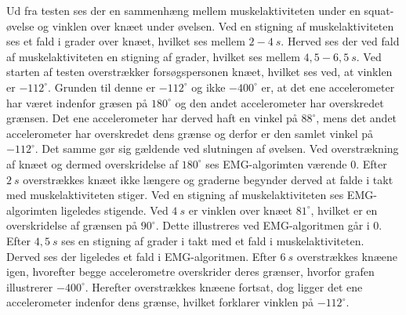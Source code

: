 \noindent
Ud fra testen ses der en sammenhæng mellem muskelaktiviteten under en squat-øvelse og vinklen over knæet under øvelsen. Ved en stigning af muskelaktiviteten ses et fald i grader over knæet, hvilket ses mellem $2-4~s$. Herved ses der ved fald af muskelaktiviteten en stigning af grader, hvilket ses mellem $4,5-6,5~s$.
Ved starten af testen overstrækker forsøgspersonen knæet, hvilket ses ved, at vinklen er $-112^{\circ}$. Grunden til denne er $-112^{\circ}$ og ikke $-400^{\circ}$ er, at det ene accelerometer har været indenfor græsen på $180^{\circ}$ og den andet accelerometer har overskredet grænsen. Det ene accelerometer har derved haft en vinkel på $88^{\circ}$, mens det andet accelerometer har overskredet dens grænse og derfor er den samlet vinkel på $-112^{\circ}$. Det samme gør sig gældende ved slutningen af øvelsen. Ved overstrækning af knæet og dermed overskridelse af $180^{\circ}$ ses EMG-algorimten værende 0. 
Efter $2~s$ overstrækkes knæet ikke længere og graderne begynder derved at falde i takt med muskelaktiviteten stiger. Ved en stigning af muskelaktiviteten ses EMG-algorimten ligeledes stigende. Ved $4~s$ er vinklen over knæet $81^{\circ}$, hvilket er en overskridelse af grænsen på $90^{\circ}$. Dette illustreres ved EMG-algoritmen går i 0. 
Efter $4,5~s$ ses en stigning af grader i takt med et fald i muskelaktiviteten. Derved ses der ligeledes et fald i EMG-algoritmen. 
Efter $6~s$ overstrækkes knæene igen, hvorefter begge accelerometre overskrider deres grænser, hvorfor grafen illustrerer $-400^{\circ}$. Herefter overstrækkes knæene fortsat, dog ligger det ene accelerometer indenfor dens grænse, hvilket forklarer vinklen på $-112^{\circ}$. 
